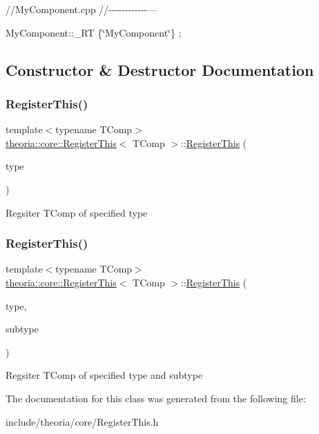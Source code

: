 //\+My\+Component.cpp //-\/-\/-\/-\/-\/-\/-\/-\/-\/-\/-\/-\/---

My\+Component\+::\+\_\+\+RT \{\char`\"{}\+My\+Component\char`\"{}\} ; 

\subsection{Constructor \& Destructor Documentation}
\mbox{\label{classtheoria_1_1core_1_1RegisterThis_ad736eff7aa2b6819197a839a08382f20}} 
\subsubsection{\texorpdfstring{Register\+This()}{RegisterThis()}\hspace{0.1cm}{\footnotesize\ttfamily [1/2]}}
{\footnotesize\ttfamily template$<$typename T\+Comp$>$ \\
\hyperlink{classtheoria_1_1core_1_1RegisterThis}{theoria\+::core\+::\+Register\+This}$<$ T\+Comp $>$\+::\hyperlink{classtheoria_1_1core_1_1RegisterThis}{Register\+This} (\begin{DoxyParamCaption}\item[{const Type\+Name \&}]{type }\end{DoxyParamCaption})\hspace{0.3cm}{\ttfamily [inline]}}

Regsiter T\+Comp of specified type \mbox{\label{classtheoria_1_1core_1_1RegisterThis_aec0af7608af32e2b828c7e3953af3695}} 
\subsubsection{\texorpdfstring{Register\+This()}{RegisterThis()}\hspace{0.1cm}{\footnotesize\ttfamily [2/2]}}
{\footnotesize\ttfamily template$<$typename T\+Comp$>$ \\
\hyperlink{classtheoria_1_1core_1_1RegisterThis}{theoria\+::core\+::\+Register\+This}$<$ T\+Comp $>$\+::\hyperlink{classtheoria_1_1core_1_1RegisterThis}{Register\+This} (\begin{DoxyParamCaption}\item[{const Type\+Name \&}]{type,  }\item[{const Sub\+Type\+Name \&}]{subtype }\end{DoxyParamCaption})\hspace{0.3cm}{\ttfamily [inline]}}

Regsiter T\+Comp of specified type and subtype 

The documentation for this class was generated from the following file\+:\begin{DoxyCompactItemize}
\item 
include/theoria/core/Register\+This.\+h\end{DoxyCompactItemize}
